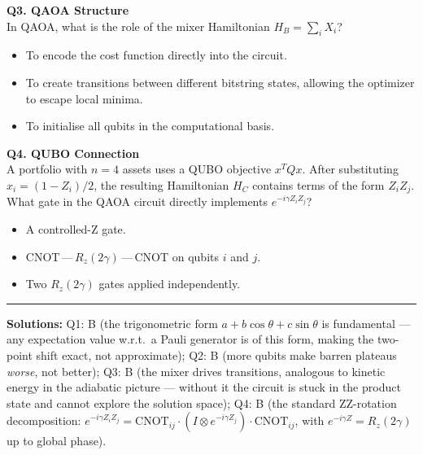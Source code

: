\documentclass[a4paper,11pt]{article}
\begin{document}
\vspace{0.3cm}
\textbf{Q3. QAOA Structure}\\
In QAOA, what is the role of the mixer Hamiltonian $H_B = \sum_i X_i$?
\begin{itemize}
    \item[A)] To encode the cost function directly into the circuit.
    \item[B)] To create transitions between different bitstring states,
              allowing the optimizer to escape local minima.
    \item[C)] To initialise all qubits in the computational basis.
\end{itemize}

\vspace{0.3cm}
\textbf{Q4. QUBO Connection}\\
A portfolio with $n=4$ assets uses a QUBO objective $x^T Q x$.
After substituting $x_i = (1-Z_i)/2$, the resulting Hamiltonian $H_C$
contains terms of the form $Z_iZ_j$. What gate in the QAOA circuit
directly implements $e^{-i\gamma Z_i Z_j}$?
\begin{itemize}
    \item[A)] A controlled-Z gate.
    \item[B)] CNOT\,—\,$R_z(2\gamma)$\,—\,CNOT on qubits $i$ and $j$.
    \item[C)] Two $R_z(2\gamma)$ gates applied independently.
\end{itemize}

\vspace{1cm}
\hrule
\vspace{0.2cm}
\footnotesize{%
\textbf{Solutions:}
Q1: B (the trigonometric form $a + b\cos\theta + c\sin\theta$ is
    fundamental — any expectation value w.r.t.\ a Pauli generator is
    of this form, making the two-point shift exact, not approximate);
Q2: B (more qubits make barren plateaus \emph{worse}, not better);
Q3: B (the mixer drives transitions, analogous to kinetic energy in
    the adiabatic picture — without it the circuit is stuck in the
    product state and cannot explore the solution space);
Q4: B (the standard ZZ-rotation decomposition:
    $e^{-i\gamma Z_i Z_j} = \mathrm{CNOT}_{ij}
    \cdot(I\otimes e^{-i\gamma Z_j})\cdot \mathrm{CNOT}_{ij}$,
    with $e^{-i\gamma Z} = R_z(2\gamma)$ up to global phase).
}
\end{document}
